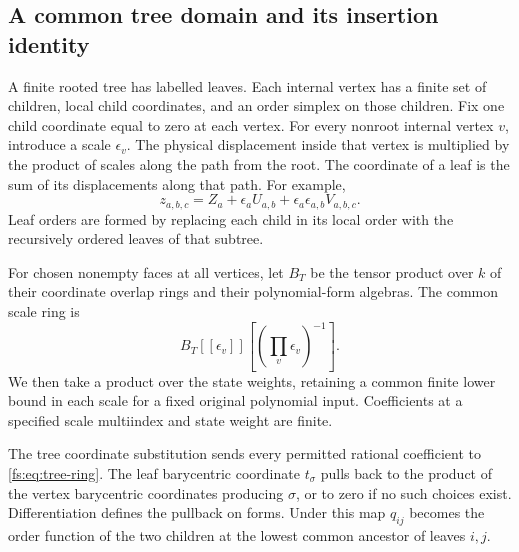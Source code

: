 \subsection{A common tree domain and its insertion identity}

A finite rooted tree has labelled leaves.  Each internal vertex has
a finite set of children, local child coordinates, and an order simplex
on those children.  Fix one child coordinate equal to zero at each
vertex.  For every nonroot internal vertex \(v\), introduce a
scale \(\epsilon_v\).  The physical displacement inside that vertex
is multiplied by the product of scales along the path from the root.
The coordinate of a leaf is the sum of its displacements along that
path.  For example,
\[
 z_{a,b,c}=Z_a+\epsilon_a U_{a,b}
                  +\epsilon_a\epsilon_{a,b}V_{a,b,c}.
\]
Leaf orders are formed by replacing each child in its local order
with the recursively ordered leaves of that subtree.

For chosen nonempty faces at all vertices, let \(B_T\) be the
tensor product over \(k\) of their coordinate overlap rings and
their polynomial-form algebras.  The common scale ring is
\begin{equation}\label{fs:eq:tree-ring}
 B_T[[\epsilon_v]][(\prod_v\epsilon_v)^{-1}].
\end{equation}
We then take a product over the state weights, retaining a common
finite lower bound in each scale for a fixed original polynomial input.
Coefficients at a specified scale multiindex and state weight are finite.

\begin{lemma}\label{fs:lem:tree-pullback}
The tree coordinate substitution sends every permitted rational
coefficient to \eqref{fs:eq:tree-ring}.
The leaf barycentric coordinate \(t_\sigma\) pulls back to the
product of the vertex barycentric coordinates producing \(\sigma\),
or to zero if no such choices exist.  Differentiation defines the
pullback on forms.  Under this map \(q_{ij}\) becomes the order
function of the two children at the lowest common ancestor of
leaves \(i,j\).
\end{lemma}

